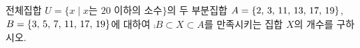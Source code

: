 전체집합 $U=\{x \mid x$는 $20$ 이하의 소수$\}$의 두 부분집합 $A=\{2,\mkern3mu 3,\mkern3mu 11,\mkern3mu 13,\mkern3mu 17,\mkern3mu 19\}$, $B=\{3,\mkern3mu 5,\mkern3mu 7,\mkern3mu 11,\mkern3mu 17,\mkern3mu 19\}$에 대하여 $\comp{B}\subset X\subset A$를 만족시키는 집합 $X$의 개수를 구하시오.
